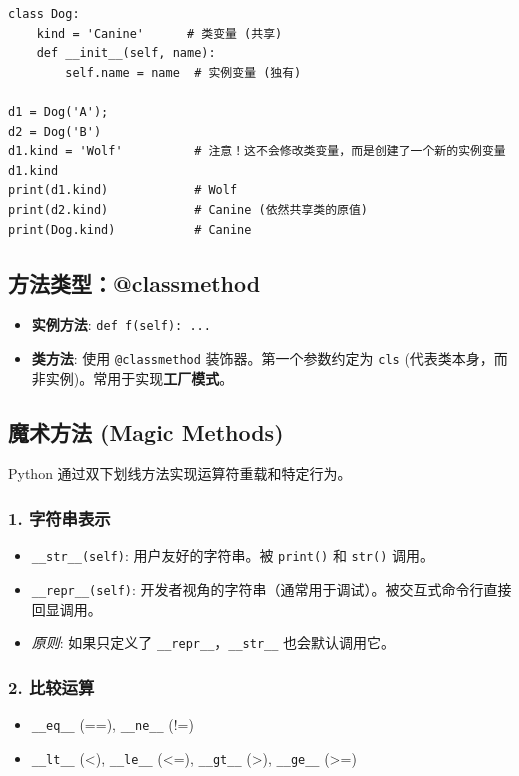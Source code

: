 \documentclass[12pt, a4paper]{article}
\begin{document}
\begin{lstlisting}[caption={类变量的遮蔽 (Shadowing)}]
class Dog:
    kind = 'Canine'      # 类变量 (共享)
    def __init__(self, name):
        self.name = name  # 实例变量 (独有)

d1 = Dog('A');
d2 = Dog('B')
d1.kind = 'Wolf'          # 注意！这不会修改类变量，而是创建了一个新的实例变量 d1.kind
print(d1.kind)            # Wolf
print(d2.kind)            # Canine (依然共享类的原值)
print(Dog.kind)           # Canine
\end{lstlisting}

\subsection{方法类型：@classmethod}

\begin{itemize}
    \item \textbf{实例方法}: \texttt{def f(self): ...}
    \item \textbf{类方法}: 使用 \texttt{@classmethod} 装饰器。第一个参数约定为 \texttt{cls} (代表类本身，而非实例)。常用于实现\textbf{工厂模式}。
\end{itemize}

\subsection{魔术方法 (Magic Methods)}

Python 通过双下划线方法实现运算符重载和特定行为。

\subsubsection{1. 字符串表示}
\begin{itemize}
    \item \texttt{\_\_str\_\_(self)}: 用户友好的字符串。被 \texttt{print()} 和 \texttt{str()} 调用。
    \item \texttt{\_\_repr\_\_(self)}: 开发者视角的字符串（通常用于调试）。被交互式命令行直接回显调用。
    \item \textit{原则}: 如果只定义了 \texttt{\_\_repr\_\_}，\texttt{\_\_str\_\_} 也会默认调用它。
\end{itemize}

\subsubsection{2. 比较运算}
\begin{itemize}
    \item \texttt{\_\_eq\_\_} (==), \texttt{\_\_ne\_\_} (!=)
    \item \texttt{\_\_lt\_\_} (<), \texttt{\_\_le\_\_} (<=), \texttt{\_\_gt\_\_} (>), \texttt{\_\_ge\_\_} (>=)
\end{itemize}
\end{document}
